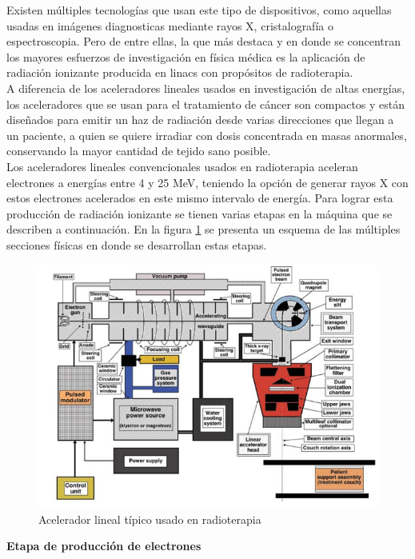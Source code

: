 Existen múltiples tecnologías que usan este tipo de dispositivos, como aquellas usadas en imágenes diagnosticas mediante rayos X, cristalografía o espectroscopia. Pero de entre ellas, la que más destaca y en donde se concentran los mayores esfuerzos de investigación en física médica es la aplicación de radiación ionizante producida en linacs con propósitos de radioterapia. \\

A diferencia de los aceleradores lineales usados en investigación de altas energías, los aceleradores que se usan para el tratamiento de cáncer son compactos y están diseñados para emitir un haz de radiación desde varias direcciones que llegan a un paciente, a quien se quiere irradiar con dosis concentrada en masas anormales, conservando la mayor cantidad de tejido sano posible.\\

Los aceleradores lineales convencionales usados en radioterapia aceleran electrones a energías entre 4 y 25 MeV, teniendo la opción de generar rayos X con estos electrones acelerados en este mismo intervalo de energía. Para lograr esta producción de radiación ionizante se tienen varias etapas en la máquina que se describen a continuación. En la figura \ref{fig:acelerador} se presenta un esquema de las múltiples secciones físicas en donde se desarrollan estas etapas.\\
\begin{figure}[H]
	\centering
	\includegraphics[width=0.9\linewidth]{images/linalc.png}
	\caption{Acelerador lineal típico usado en radioterapia \cite{podgorsak}}
	\label{fig:acelerador}
\end{figure}

\textbf{Etapa de producción de electrones}\\

